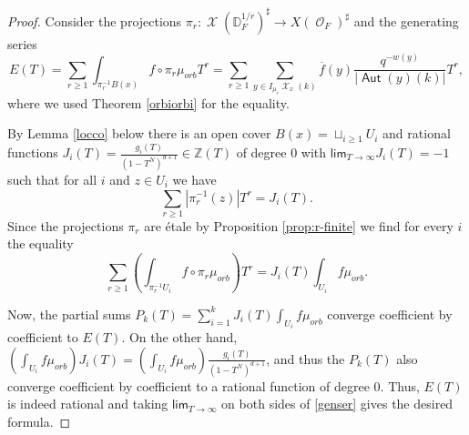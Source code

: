 \documentclass{article}
\DeclareMathOperator{\Xc}{\mathcal{X}}
\DeclareMathOperator{\Oc}{\mathcal{O}}
\renewcommand{\lim}{\mathsf{lim}}
\DeclareMathOperator{\Aut}{\mathsf{Aut}}
\newcommand{\BZ}{{\mathbb{Z}}}
\newcommand{\Dr}[1][r]{\mathbb{D}_F^{1/#1}}
\theoremstyle{definition}
\theoremstyle{plain}
\begin{document}
\begin{proof} Consider the projections $\pi_r: \Xc(\Dr)^\sharp \to X(\Oc_F)^\sharp$ and the generating series
\begin{equation}\label{genser} E(T) = \sum_{r \geq 1} \int_{\pi_r^{-1}B(x)} f \circ \pi_r \mu_{orb} T^r= \sum_{r\geq 1} \sum_{y \in I_{\mu_r}\Xc_x(k)}\overline{f}(y)\frac{q^{-w(y)}}{|\Aut(y)(k)|}T^r,\end{equation}
where we used Theorem \ref{orbiorbi} for the equality. 

By Lemma \ref{locco} below there is an open cover $B(x) = \sqcup_{i \geq 1} U_i$ and rational functions $J_i(T) = \frac{g_i(T)}{(1-T^N)^{d+1}} \in \BZ(T)$ of degree $0$ with $\lim_{T \to \infty} J_i(T) = -1$ such that for all $i$ and $z \in U_i$ we have
\[ \sum_{r \geq 1}  |\pi_r^{-1}(z)| T^r = J_i(T).\] 
Since the projections $\pi_r$ are étale by Proposition \ref{prop:r-finite} we find for every $i$ the equality
\[  \sum_{r \geq 1} \left( \int_{\pi_r^{-1}U_i} f \circ \pi_r \mu_{orb} \right) T^r  =  J_i(T) \int_{U_i} f \mu_{orb}.\]


Now, the partial sums $P_k(T)= \sum_{i=1}^k J_i(T)\int_{U_i}f \mu_{orb}$ converge coefficient by coefficient to $E(T)$. On the other hand, $\left(\int_{U_i}f \mu_{orb}\right)J_i(T)= \left(\int_{U_i}f \mu_{orb}\right)\frac{g_i(T)}{(1-T^{N})^{d+1}}$, and thus the $P_k(T)$ also converge coefficient by coefficient to a rational function of degree $0$. Thus, $E(T)$ is indeed rational and taking $\lim_{T \to \infty}$ on both sides of \eqref{genser} gives the desired formula.
\end{proof}
\end{document}
